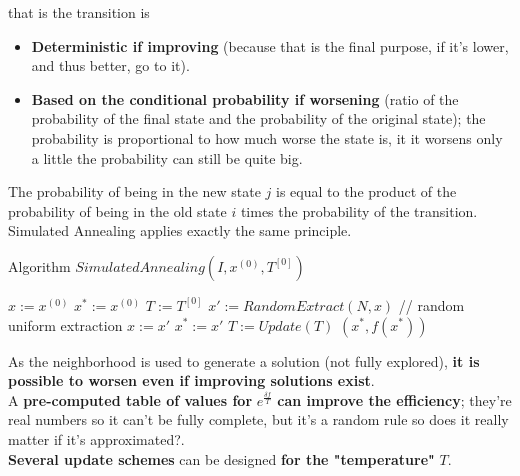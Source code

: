 that is the transition is
\begin{itemize}
	\item \textbf{Deterministic if improving} (because that is the final purpose, if it's lower, and thus better, go to it).\\
	
	\item \textbf{Based on the conditional probability if worsening} (ratio of the probability of the final state and the probability of the original state); the probability is proportional to how much worse the state is, it it worsens only a little the probability can still be quite big.\\
\end{itemize}

The probability of being in the new state $j$ is equal to the product of the probability of being in the old state $i$ times the probability of the transition.\\

Simulated Annealing applies exactly the same principle.\\

\newpage

\begin{algorithm}
	\caption{Algorithm $SimulatedAnnealing(I , x^{(0)}, T^{[0]})$}
	\begin{algorithmic}
		\STATE $x := x^{(0)}$ 
		\STATE $x^\ast := x^{(0)}$ 
		\STATE $T := T^{[0]}$
		\STATE $x' := RandomExtract(N, x)$ // random uniform extraction
		\STATE $x := x'$
		\ENDIF
		\STATE $x^\ast := x'$
		\ENDIF
		$T := Update(T )$
		\ENDWHILE
		\RETURN $(x^\ast, f (x^\ast))$
	\end{algorithmic}
\end{algorithm}

As the neighborhood is used to generate a solution (not fully explored), \textbf{it is possible to worsen even if improving solutions exist}.\\

A \textbf{pre-computed table of values for} $e^{\frac{\delta f}{T}}$ \textbf{can improve the efficiency}; they're real numbers so it can't be fully complete, but it's a random rule so does it really matter if it's approximated?.\\

\textbf{Several update schemes} can be designed \textbf{for the "temperature"} $T$.\\

